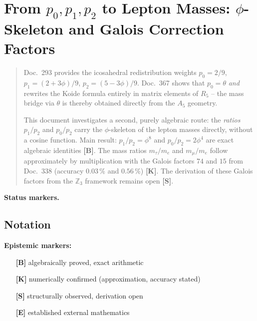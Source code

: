 
\providecommand{\BM}{\textbf{[B]}}
\providecommand{\KM}{\textbf{[K]}}
\providecommand{\SM}{\textbf{[S]}}
\providecommand{\EM}{\textbf{[E]}}

\chapter*{From $p_0,p_1,p_2$ to Lepton Masses: $\phi$-Skeleton and Galois Correction Factors}

\begin{abstract}
Doc.~293 provides the icosahedral redistribution weights $p_0=2/9$,
$p_1=(2{+}3\phi)/9$, $p_2=(5{-}3\phi)/9$. Doc.~367 shows that $p_0=\theta$
\emph{and} rewrites the Koide formula entirely in matrix elements of $R_5$ --
the mass bridge via $\theta$ is thereby obtained directly from the $A_5$ geometry.

This document investigates a second, purely algebraic route: the \emph{ratios}
$p_1/p_2$ and $p_0/p_2$ carry the $\phi$-skeleton of the lepton masses directly,
without a cosine function.
Main result: $p_1/p_2 = \phi^8$ and $p_0/p_2 = 2\phi^4$ are exact algebraic
identities \BM. The mass ratios $m_\tau/m_e$ and $m_\mu/m_e$ follow approximately
by multiplication with the Galois factors $74$ and $15$ from Doc.~338
(accuracy $0{.}03\,\%$ and $0{.}56\,\%$) \KM. The derivation of these Galois
factors from the $\mathbb{Z}_3$ framework remains open \SM.
\end{abstract}
\medskip\noindent\textbf{Status markers.}



\section*{Notation}

\textbf{Epistemic markers:}
\begin{itemize}[leftmargin=2em,itemsep=0pt,topsep=2pt]
  \item[\textbf{[B]}] algebraically proved, exact arithmetic
  \item[\textbf{[K]}] numerically confirmed (approximation, accuracy stated)
  \item[\textbf{[S]}] structurally observed, derivation open
  \item[\textbf{[E]}] established external mathematics
\end{itemize}

